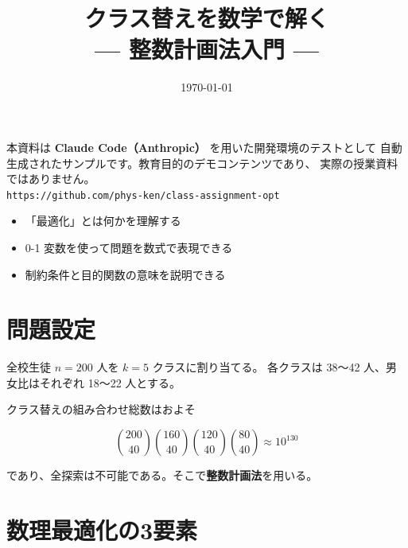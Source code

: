 \documentclass[a4paper, 11pt, fleqn]{ltjsarticle}
\title{クラス替えを数学で解く\\
       \large — 整数計画法入門 —}
\date{\today}
\begin{document}
\maketitle
\thispagestyle{fancy}

\begin{tcolorbox}[colback=yellow!10, colframe=orange!60,
                  title=\textbf{⚠️ このドキュメントについて}]
  本資料は \textbf{Claude Code（Anthropic）} を用いた開発環境のテストとして
  自動生成されたサンプルです。教育目的のデモコンテンツであり、
  実際の授業資料ではありません。\\[4pt]
  \texttt{https://github.com/phys-ken/class-assignment-opt}
\end{tcolorbox}

\bigskip

\begin{tcolorbox}[colback=blue!5, colframe=blue!40, title=\textbf{学習目標}]
  \begin{itemize}
    \item 「最適化」とは何かを理解する
    \item 0-1 変数を使って問題を数式で表現できる
    \item 制約条件と目的関数の意味を説明できる
  \end{itemize}
\end{tcolorbox}

\bigskip

\section{問題設定}

全校生徒 $n = 200$ 人を $k = 5$ クラスに割り当てる。
各クラスは 38〜42 人、男女比はそれぞれ 18〜22 人とする。

クラス替えの組み合わせ総数はおよそ

\[
  \binom{200}{40}\binom{160}{40}\binom{120}{40}\binom{80}{40} \approx 10^{130}
\]

であり、全探索は不可能である。そこで\textbf{整数計画法}を用いる。

\section{数理最適化の3要素}
\end{document}
